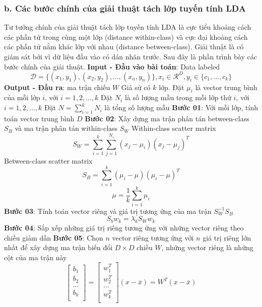 \documentclass{article}
\begin{document}
	\subsubsection{b. Các bước chính của giải thuật tách lớp tuyến tính LDA}
	\qquad Tư tưởng chính của giải thuật tách lớp tuyến tính LDA là cực tiểu khoảng cách các phần tử trong cùng một lớp (distance within-class) và cực đại khoảng cách các phần tử nằm khác lớp với nhau (distance between-class). Giải thuật là có giám sát bởi vì dữ liệu đầu vào có dán nhãn trước. Sau đây là phần trình bày các bước chính của giải thuật.\newline
	\textbf{Input - Đầu vào bài toán}: Data labeled $$\mathcal{D} = \{(x_1, y_1), (x_2, y_2), ..., (x_n, y_n)\}, x_i \in \mathcal{R}^D, y_i \in \{c_1, ..., c_k\}$$
	\textbf{Output - Đầu ra}: ma trận chiếu $W$\newline
	Giả sử có $k$ lớp. Đặt $\mu_i$ là vector trung bình của mỗi lớp $i$, với $i = 1, 2, ..., k$\newline
	Đặt $N_i$ là số lượng mẫu trong mỗi lớp thứ  $i$, với $i = 1, 2, ..., k$\newline
	Đặt $N = \sum_{i=1}^kN_i$ là tổng số lượng mẫu\newline
	\textbf{Bước 01}: Với mỗi lớp, tính toán vector trung bình $D$\newline
	\textbf{Bước 02}: Xây dựng ma trận phân tán between-class $S_B$ và ma trận phân tán within-class $S_W$\newline
	Within-class scatter matrix
	$$S_W = \sum_{i=1}^k\sum_{j=1}^{N_i}(x_j - \mu_i)(x_j - \mu_j)^T$$
	Between-class scatter matrix
	$$S_B = \sum_{i=1}^k(\mu_i - \mu)(\mu_i - \mu)^T$$
	$$\mu = \frac{1}{k}\sum_{i=1}^k\mu_i$$
	\textbf{Bước 03}: Tính toán vector riêng và giá trị tương ứng của ma trận $S_W^{-1}S_B$
	$$S_bw_k = \lambda_kS_Ww_k$$
	\textbf{Bước 04}: Sắp xếp những giá trị riêng tương ứng với những vector riêng theo chiều giảm dần\newline
	\textbf{Bước 05}: Chọn $n$ vector riêng tương ứng với $n$ giá trị riêng lớn nhất để xây dựng ma trận biến đổi $D \times D$ chiều $W$, những vector riêng là những cột của ma trận này
	$$
	\begin{bmatrix}
		b_1 \\
		b_2 \\
		... \\
		b_k \\
	\end{bmatrix} = 
	\begin{bmatrix}
		w_1^T \\
		w_2^T \\
		... \\
		w_k^T \\
	\end{bmatrix}(x- \bar{x}) = W^T(x- \bar{x})
	$$
\end{document}
